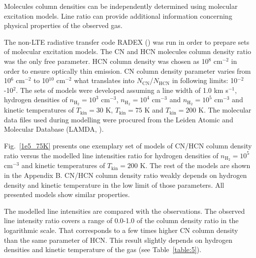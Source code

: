 \documentclass{aa}
\begin{document}
Molecules column densities can be independently determined using molecular excitation models. Line ratio can provide additional information concerning physical properties of the observed gas. 

The non-LTE radiative transfer code RADEX (\cite{vdT07}) was run in order to prepare sets of molecular excitation models. The CN and HCN molecules column density ratio was the only free parameter. HCN column density was chosen as 10$^8$ cm$^{-2}$ in order to ensure optically thin emission. CN column density parameter varies from 10$^6$ cm$^{-2}$ to 10$^{10}$ cm$^{-2}$ what translates into $N_\mathrm{CN}$/$N_\mathrm{HCN}$ in following limits: 10$^{-2}$-10$^{2}$. The sets of models were developed assuming a line width of 1.0 km s$^{-1}$, hydrogen densities of $n_\mathrm{H_2} = 10^3$ cm$^{-3}$, $n_\mathrm{H_2} = 10^4$ cm$^{-3}$ and $n_\mathrm{H_2} = 10^5$ cm$^{-3}$ and kinetic temperatures of $T_\mathrm{kin} = 30$ K, $T_\mathrm{kin} = 75$ K and $T_\mathrm{kin} =200$ K. The molecular data files used during modelling were procured from the Leiden Atomic and Molecular Database (LAMDA, \cite{Sch05}).

Fig.~\ref{1e5_75K} presents one exemplary set of models of CN/HCN column density ratio versus the modelled line intensities ratio for hydrogen densities of $n_\mathrm{H_2} = 10^5$ cm$^{-3}$ and kinetic temperatures of $T_\mathrm{kin} = 200$ K. The rest of the models are shown in the Appendix B. CN/HCN column density ratio weakly depends on hydrogen density and kinetic temperature in the low limit of those parameters. All presented models show similar properties.

The modelled line intensities are compared with the observations. The observed line intensity ratio covers a range of \mbox{0.0-1.0} of the column density ratio in the logarithmic scale. That corresponds to a few times higher CN column density than the same parameter of HCN. This result slightly depends on hydrogen densities and kinetic temperature of the gas (see Table~\ref{table:5}).
\end{document}
